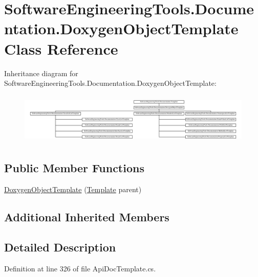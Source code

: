 \hypertarget{class_software_engineering_tools_1_1_documentation_1_1_doxygen_object_template}{\section{Software\+Engineering\+Tools.\+Documentation.\+Doxygen\+Object\+Template Class Reference}
\label{class_software_engineering_tools_1_1_documentation_1_1_doxygen_object_template}
}
Inheritance diagram for Software\+Engineering\+Tools.\+Documentation.\+Doxygen\+Object\+Template\+:\begin{figure}[H]
\begin{center}
\leavevmode
\includegraphics[height=2.474748cm]{class_software_engineering_tools_1_1_documentation_1_1_doxygen_object_template}
\end{center}
\end{figure}
\subsection*{Public Member Functions}
\begin{DoxyCompactItemize}
\item 
\hyperlink{class_software_engineering_tools_1_1_documentation_1_1_doxygen_object_template_a497b6fa0ee90a4f7c24ae5595b4371b5}{Doxygen\+Object\+Template} (\hyperlink{class_software_engineering_tools_1_1_documentation_1_1_template}{Template} parent)
\end{DoxyCompactItemize}
\subsection*{Additional Inherited Members}


\subsection{Detailed Description}


Definition at line 326 of file Api\+Doc\+Template.\+cs.



